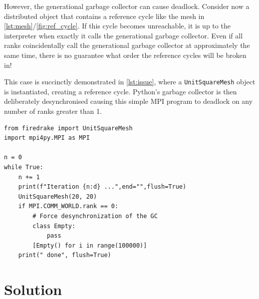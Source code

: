 \documentclass[10pt,journal,compsoc]{IEEEtran}
\begin{document}
However, the generational garbage collector can cause deadlock. Consider now a distributed object that contains a reference cycle like the mesh in \cref{lst:mesh}/\cref{fig:ref_cycle}. If this cycle becomes unreachable, it is up to the interpreter when exactly it calls the generational garbage collector. Even if all ranks coincidentally call the generational garbage collector at approximately the same time, there is no guarantee what order the reference cycles will be broken in!

This case is succinctly demonstrated in \cref{lst:issue}, where a \verb`UnitSquareMesh` object is instantiated, creating a reference cycle. Python's garbage collector is then deliberately desynchronised causing this simple MPI program to deadlock on any number of ranks greater than 1.

\begin{lstlisting}[float={t}, caption={Example of code that forces a deadlock}, label={lst:issue}]
from firedrake import UnitSquareMesh
import mpi4py.MPI as MPI

n = 0
while True:
    n += 1
    print(f"Iteration {n:d} ...",end="",flush=True)
    UnitSquareMesh(20, 20)
    if MPI.COMM_WORLD.rank == 0:
        # Force desynchronization of the GC
        class Empty:
            pass
        [Empty() for i in range(100000)]
    print(" done", flush=True)
\end{lstlisting}

\section{Solution}
\label{sec:solution}
\end{document}
